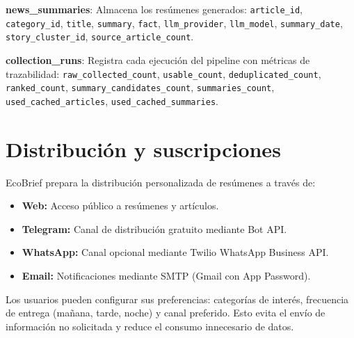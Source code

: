 \textbf{news\_summaries}: Almacena los res\'umenes generados: \texttt{article\_id}, \texttt{category\_id}, \texttt{title}, \texttt{summary}, \texttt{fact}, \texttt{llm\_provider}, \texttt{llm\_model}, \texttt{summary\_date}, \texttt{story\_cluster\_id}, \texttt{source\_article\_count}.

\textbf{collection\_runs}: Registra cada ejecuci\'on del pipeline con m\'etricas de trazabilidad: \texttt{raw\_collected\_count}, \texttt{usable\_count}, \texttt{deduplicated\_count}, \texttt{ranked\_count}, \texttt{summary\_candidates\_count}, \texttt{summaries\_count}, \texttt{used\_cached\_articles}, \texttt{used\_cached\_summaries}.

\section{Distribuci\'on y suscripciones}

EcoBrief prepara la distribuci\'on personalizada de res\'umenes a trav\'es de:

\begin{itemize}[nosep]
    \item \textbf{Web:} Acceso p\'ublico a res\'umenes y art\'iculos.
    \item \textbf{Telegram:} Canal de distribuci\'on gratuito mediante Bot API.
    \item \textbf{WhatsApp:} Canal opcional mediante Twilio WhatsApp Business API.
    \item \textbf{Email:} Notificaciones mediante SMTP (Gmail con App Password).
\end{itemize}

Los usuarios pueden configurar sus preferencias: categor\'ias de inter\'es, frecuencia de entrega (ma\~nana, tarde, noche) y canal preferido. Esto evita el env\'io de informaci\'on no solicitada y reduce el consumo innecesario de datos.
